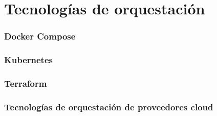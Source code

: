 \section{Tecnologías de orquestación} \label{ch:orq}
\subsubsection{Docker Compose}
\subsubsection{Kubernetes}
\subsubsection{Terraform}
\subsubsection{Tecnologías de orquestación de proveedores cloud}
